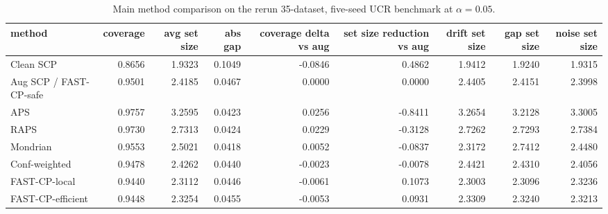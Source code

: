 \begin{table}[t]
\centering
\small
\begin{tabular}{lrrrrrrrr}
\toprule
method & coverage & avg set size & abs gap & coverage delta vs aug & set size reduction vs aug & drift set size & gap set size & noise set size \\
\midrule
Clean SCP & 0.8656 & 1.9323 & 0.1049 & -0.0846 & 0.4862 & 1.9412 & 1.9240 & 1.9315 \\
Aug SCP / FAST-CP-safe & 0.9501 & 2.4185 & 0.0467 & 0.0000 & 0.0000 & 2.4405 & 2.4151 & 2.3998 \\
APS & 0.9757 & 3.2595 & 0.0423 & 0.0256 & -0.8411 & 3.2654 & 3.2128 & 3.3005 \\
RAPS & 0.9730 & 2.7313 & 0.0424 & 0.0229 & -0.3128 & 2.7262 & 2.7293 & 2.7384 \\
Mondrian & 0.9553 & 2.5021 & 0.0418 & 0.0052 & -0.0837 & 2.3172 & 2.7412 & 2.4480 \\
Conf-weighted & 0.9478 & 2.4262 & 0.0440 & -0.0023 & -0.0078 & 2.4421 & 2.4310 & 2.4056 \\
FAST-CP-local & 0.9440 & 2.3112 & 0.0446 & -0.0061 & 0.1073 & 2.3003 & 2.3096 & 2.3236 \\
FAST-CP-efficient & 0.9448 & 2.3254 & 0.0455 & -0.0053 & 0.0931 & 2.3309 & 2.3240 & 2.3213 \\
\bottomrule
\end{tabular}
\caption{Main method comparison on the rerun 35-dataset, five-seed UCR benchmark at $\alpha=0.05$.}
\label{tab:full_method_table}
\end{table}
